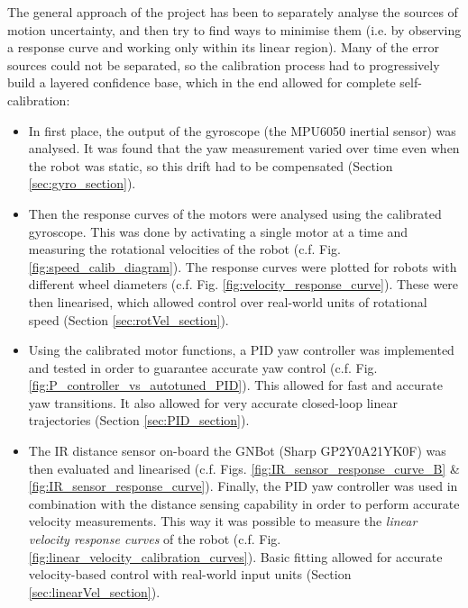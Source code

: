 \documentclass[12pt,twoside]{report}
\begin{document}
The general approach of the project has been to separately analyse the sources of motion uncertainty, and then try to find ways to minimise them (i.e. by observing a response curve and working only within its linear region). Many of the error sources could not be separated, so the calibration process had to progressively build a layered confidence base, which in the end allowed for complete self-calibration:

\vspace{-3.5mm}

\begin{itemize}
\item In first place, the output of the gyroscope (the MPU6050 inertial sensor) was analysed. It was found that the yaw measurement varied over time even when the robot was static, so this drift had to be compensated (Section \ref{sec:gyro_section}).
\item Then the response curves of the motors were analysed using the calibrated gyroscope. This was done by activating a single motor at a time and measuring the rotational velocities of the robot (c.f. Fig. \ref{fig:speed_calib_diagram}). The response curves were plotted for robots with different wheel diameters (c.f. Fig. \ref{fig:velocity_response_curve}). These were then linearised, which allowed control over real-world units of rotational speed (Section \ref{sec:rotVel_section}).
\item Using the calibrated motor functions, a PID yaw controller was implemented and tested in order to guarantee accurate yaw control (c.f. Fig. \ref{fig:P_controller_vs_autotuned_PID}). This allowed for fast and accurate yaw transitions. It also allowed for very accurate closed-loop linear trajectories (Section \ref{sec:PID_section}).
\item The IR distance sensor on-board the GNBot (Sharp GP2Y0A21YK0F) was then evaluated and linearised (c.f. Figs. \ref{fig:IR_sensor_response_curve_B} \& \ref{fig:IR_sensor_response_curve}).
Finally, the PID yaw controller was used in combination with the distance sensing capability in order to perform accurate velocity measurements. This way it was possible to measure the \emph{linear velocity response curves} of the robot (c.f. Fig. \ref{fig:linear_velocity_calibration_curves}). Basic fitting allowed for accurate velocity-based control with real-world input units (Section \ref{sec:linearVel_section}).
\end{itemize}

\vspace{-5mm}
\end{document}
